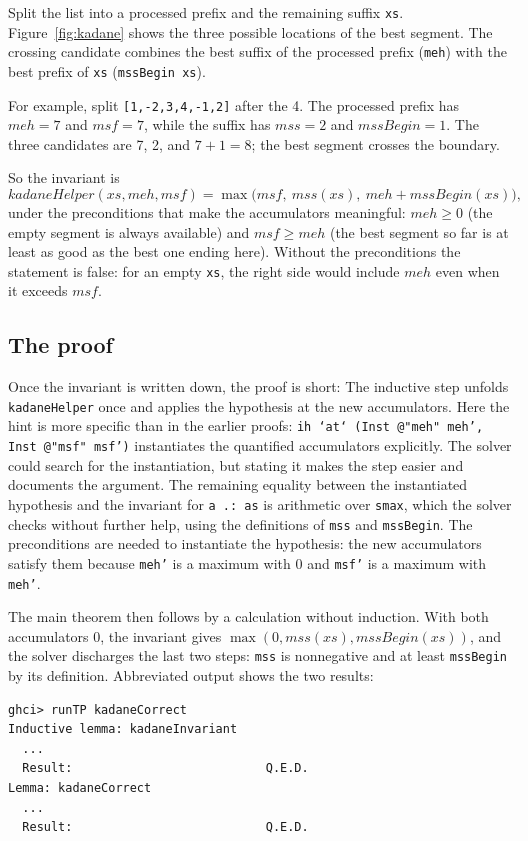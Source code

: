 \documentclass[review]{jfp-epi}
\newcommand{\code}[1]{\texttt{#1}}
\begin{document}
Split the list into a processed prefix and the remaining suffix \code{xs}.
Figure~\ref{fig:kadane} shows the three possible locations of the best segment.
The crossing candidate combines the best suffix of the processed prefix
(\code{meh}) with the best prefix of \code{xs} (\code{mssBegin xs}).

For example, split \code{[1,-2,3,4,-1,2]} after the 4. The processed prefix has
$\mathit{meh}=7$ and $\mathit{msf}=7$, while the suffix has
$\mathit{mss}=2$ and $\mathit{mssBegin}=1$. The three candidates are 7, 2, and
$7+1=8$; the best segment crosses the boundary.
\begin{samepage}
So the invariant is
\[
  \mathit{kadaneHelper}(xs, \mathit{meh}, \mathit{msf})
  = \max\bigl(\mathit{msf},\ \mathit{mss}(xs),\ \mathit{meh} + \mathit{mssBegin}(xs)\bigr),
\]
under the preconditions that make the accumulators meaningful:
$\mathit{meh} \geq 0$ (the empty segment is always available) and
$\mathit{msf} \geq \mathit{meh}$ (the best segment so far is at least as good as
the best one ending here). Without the preconditions the statement is false: for
an empty \code{xs}, the right side would include $\mathit{meh}$ even when it
exceeds $\mathit{msf}$.
\end{samepage}

\subsection{The proof}

Once the invariant is written down, the proof is short:
The inductive step unfolds \code{kadaneHelper} once and applies the hypothesis
at the new accumulators. Here the hint is more specific than in the earlier
proofs: \code{ih `at` (Inst @"meh" meh', Inst @"msf" msf')} instantiates the
quantified accumulators explicitly. The solver could search for the
instantiation, but stating it makes the step easier and documents the argument.
The remaining equality between the instantiated hypothesis and the invariant
for \code{a .: as} is arithmetic over \code{smax}, which the solver checks
without further help, using the definitions of \code{mss} and \code{mssBegin}.
The preconditions are needed to instantiate the hypothesis: the new accumulators
satisfy them because \code{meh'} is a maximum with 0 and \code{msf'} is a
maximum with \code{meh'}.

The main theorem then follows by a calculation without induction. With both
accumulators 0, the invariant gives
$\max(0, \mathit{mss}(xs), \mathit{mssBegin}(xs))$, and the solver discharges the
last two steps: \code{mss} is nonnegative and at least \code{mssBegin} by its
definition. Abbreviated output shows the two results:
\begin{lstlisting}[style=output]
ghci> runTP kadaneCorrect
Inductive lemma: kadaneInvariant
  ...
  Result:                           Q.E.D.
Lemma: kadaneCorrect
  ...
  Result:                           Q.E.D.
\end{lstlisting}
\end{document}

